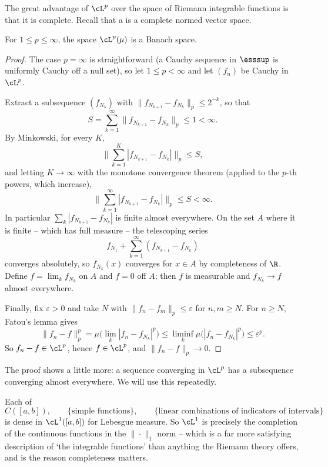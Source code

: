 The great advantage of $\cL^p$ over the space of Riemann integrable functions is that it is complete. Recall that a  is a complete normed vector space.

\begin{theorem}\label{thm:riesz-fischer}
	For $1 \leq p\leq\infty$, the space $\cL^p(\mu)$ is a Banach space.
\end{theorem}
\begin{proof}
	The case $p=\infty$ is straightforward (a Cauchy sequence in $\esssup$ is uniformly Cauchy off a null set), so let $1\leq p<\infty$ and let $(f_n)$ be Cauchy in $\cL^p$.

	Extract a subsequence $(f_{N_k})$ with $\|f_{N_{k+1}}-f_{N_k}\|_p \leq 2^{-k}$, so that
	$$
	S = \sum_{k=1}^\infty \|f_{N_{k+1}}-f_{N_k}\|_p \leq 1 < \infty.
	$$
	By Minkowski, for every $K$,
	$$
	\Big\| \sum_{k=1}^K |f_{N_{k+1}}-f_{N_k}| \Big\|_p \leq S,
	$$
	and letting $K \to \infty$ with the monotone convergence theorem (applied to the $p$-th powers, which increase),
	$$
	\Big\| \sum_{k=1}^\infty |f_{N_{k+1}}-f_{N_k}| \Big\|_p \leq S < \infty.
	$$
	In particular $\sum_k |f_{N_{k+1}}-f_{N_k}|$ is finite almost everywhere. On the set $A$ where it is finite -- which has full measure -- the telescoping series
	$$
	f_{N_1} + \sum_{k=1}^\infty (f_{N_{k+1}}-f_{N_k})
	$$
	converges absolutely, so $f_{N_k}(x)$ converges for $x \in A$ by completeness of $\R$. Define $f = \lim_k f_{N_k}$ on $A$ and $f = 0$ off $A$; then $f$ is measurable and $f_{N_k}\to f$ almost everywhere.

	Finally, fix $\varepsilon>0$ and take $N$ with $\|f_n - f_m\|_p \leq \varepsilon$ for $n,m\geq N$. For $n \geq N$, Fatou's lemma gives
	$$
	\|f_n - f\|_p^p = \mu\big(\lim_k |f_n - f_{N_k}|^p\big) \leq \liminf_k \mu\big(|f_n-f_{N_k}|^p\big) \leq \varepsilon^p.
	$$
	So $f_n - f \in \cL^p$, hence $f \in \cL^p$, and $\|f_n-f\|_p \to 0$.
\end{proof}

\begin{remark}
	The proof shows a little more: a sequence converging in $\cL^p$ has a subsequence converging almost everywhere. We will use this repeatedly.
\end{remark}

\begin{remark}
	Each of
	$$
	C([a,b]), \qquad \{\text{simple functions}\}, \qquad \{\text{linear combinations of indicators of intervals}\}
	$$
	is dense in $\cL^1([a,b])$ for Lebesgue measure. So $\cL^1$ is precisely the completion of the continuous functions in the $\|\cdot\|_1$ norm -- which is a far more satisfying description of `the integrable functions' than anything the Riemann theory offers, and is the reason completeness matters.
\end{remark}

